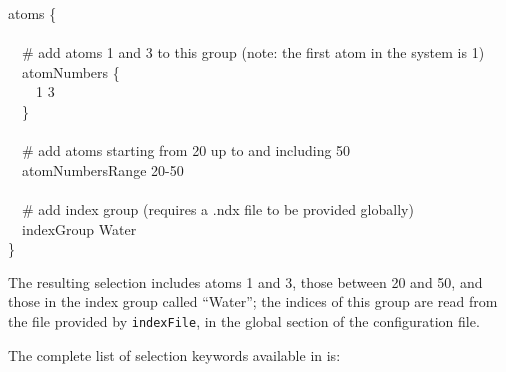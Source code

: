 {%
\noindent\ttfamily atoms \{\\
\\
\-~~\# add atoms 1 and 3 to this group (note: the first atom in the system is 1)\\
\-~~atomNumbers \{ \\
\-~~~~1 3\\
\-~~\}\\
\\
\-~~\# add atoms starting from 20 up to and including 50\\
\-~~atomNumbersRange  20-50\\
\\
\-~~\# add index group (requires a .ndx file to be provided globally)\\
\-~~indexGroup Water\\
}
{\noindent\ttfamily\}\\}

The resulting selection includes atoms 1 and 3, those between 20 and 50, and those in the index group called ``Water''; the indices of this group are read from the file provided by \texttt{indexFile}, in the global section of the configuration file.

The complete list of selection keywords available in \MDENGINE{} is:

